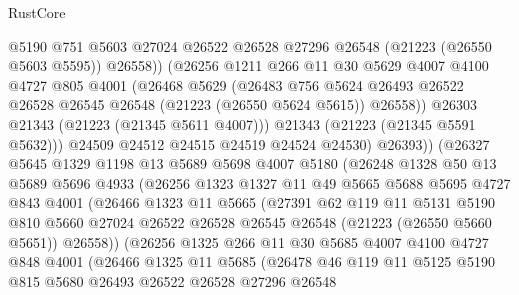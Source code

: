 \begin{lexlean}{RustCore}
\begin{coremodule}
                  @5190
                  @751
                  @5603
                  @27024
                  @26522
                  @26528
                  @27296
                  @26548
                  (@21223 (@26550 @5603 @5595))
                  @26558))
              (@26256
                @1211
                @266
                @11
                @30
                @5629
                @4007
                @4100
                @4727
                @805
                @4001
                (@26468
                  @5629
                  (@26483
                    @756
                    @5624
                    @26493
                    @26522
                    @26528
                    @26545
                    @26548
                    (@21223 (@26550 @5624 @5615))
                    @26558))
                @26303
                @21343
                (@21223 (@21345 @5611 @4007)))
              @21343
              (@21223 (@21345 @5591 @5632)))
            @24509
            @24512
            @24515
            @24519
            @24524
            @24530)
          @26393))
      (@26327
        @5645
        @1329
        @1198
        @13
        @5689
        @5698
        @4007
        @5180
        (@26248
          @1328
          @50
          @13
          @5689
          @5696
          @4933
          (@26256
            @1323
            @1327
            @11
            @49
            @5665
            @5688
            @5695
            @4727
            @843
            @4001
            (@26466
              @1323
              @11
              @5665
              (@27391
                @62
                @119
                @11
                @5131
                @5190
                @810
                @5660
                @27024
                @26522
                @26528
                @26545
                @26548
                (@21223 (@26550 @5660 @5651))
                @26558))
            (@26256
              @1325
              @266
              @11
              @30
              @5685
              @4007
              @4100
              @4727
              @848
              @4001
              (@26466
                @1325
                @11
                @5685
                (@26478
                  @46
                  @119
                  @11
                  @5125
                  @5190
                  @815
                  @5680
                  @26493
                  @26522
                  @26528
                  @27296
                  @26548

\end{coremodule}
\end{lexlean}
